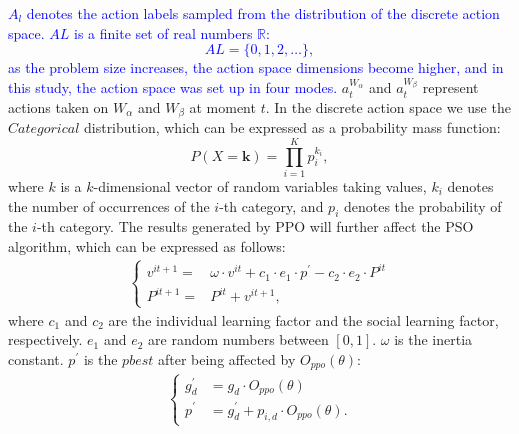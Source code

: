 \documentclass[review]{elsarticle}
\begin{document}
\textcolor{blue}{$A_{l}$ denotes the action labels sampled from the distribution of the discrete action space. $AL$ is a finite set of real numbers $\mathbb{R}$:
\begin{equation}
	\label{al}
	AL = \{0, 1, 2, \dots\},
\end{equation}
as the problem size increases, the action space dimensions become higher, and in this study, the action space was set up in four modes.} ${a}_{t}^{W_{\alpha}}$ and ${a}_{t}^{W_{\beta}}$ represent actions taken on $W_{\alpha}$ and $W_{\beta}$ at moment $t$. In the discrete action space we use the $Categorical$ distribution, which can be expressed as a probability mass function:
\begin{equation}
	\label{cate}
	P(X = \mathbf{k}) = \prod_{i=1}^{K} p_i^{k_i},
\end{equation}
where $k$ is a $k$-dimensional vector of random variables taking values, $k_{i}$ denotes the number of occurrences of the $i$-th category, and $p_{i}$ denotes the probability of the $i$-th category. The results generated by PPO will further affect the PSO algorithm, which can be expressed as follows:
\begin{align}
	\label{reorg}
	\begin{cases}
		v^{it+1} =& \omega \cdot v^{it} + c_1 \cdot e_1 \cdot p^{\prime} - c_2 \cdot e_2 \cdot P^{it} \\
		P^{it+1} =& P^{it} + v^{it+1},
	\end{cases}
\end{align}
where $c_1$ and $c_2$ are the individual learning factor and the social learning factor, respectively. $e_1$ and $e_2$ are random numbers between $[0, 1]$. $\omega$ is the inertia constant. $p^{\prime}$ is the $pbest$ after being affected by $O_{ppo}(\theta)$:
\begin{align}
	\label{reorg2}
	\begin{cases}
		g_{d}^{\prime} &= g_{d} \cdot O_{ppo}(\theta)\\
		p^{\prime} &= g_{d}^{\prime} + p_{i,d}\cdot O_{ppo}(\theta).
	\end{cases}
\end{align}
\end{document}
